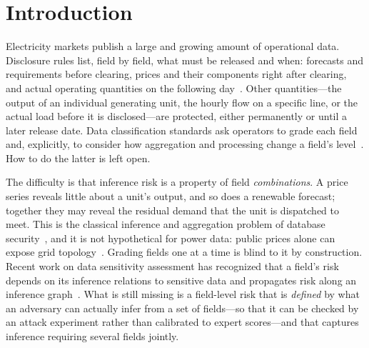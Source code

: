 \section{Introduction}\label{sec:intro}

Electricity markets publish a large and growing amount of operational data. Disclosure rules
list, field by field, what must be released and when: forecasts and requirements before
clearing, prices and their components right after clearing, and actual operating quantities on
the following day~\cite{nea2024disclosure}. Other quantities---the output of an individual
generating unit, the hourly flow on a specific line, or the actual load before it is
disclosed---are protected, either permanently or until a later release date. Data
classification standards ask operators to grade each field and, explicitly, to consider how
aggregation and processing change a field's level~\cite{gbt43697}. How to do the latter is
left open.

The difficulty is that inference risk is a property of field \emph{combinations}. A price
series reveals little about a unit's output, and so does a renewable forecast; together they
may reveal the residual demand that the unit is dispatched to meet. This is the classical
inference and aggregation problem of database security~\cite{lunt1989aggregation,farkas2002inference},
and it is not hypothetical for power data: public prices alone can expose grid
topology~\cite{kekatos2014topology}. Grading fields one at a time is blind to it by
construction. Recent work on data sensitivity assessment has recognized that a field's risk
depends on its inference relations to sensitive data and propagates risk along an inference
graph~\cite{hu2026ignn}. What is still missing is a field-level risk that is \emph{defined} by
what an adversary can actually infer from a set of fields---so that it can be checked by an
attack experiment rather than calibrated to expert scores---and that captures inference
requiring several fields jointly.

